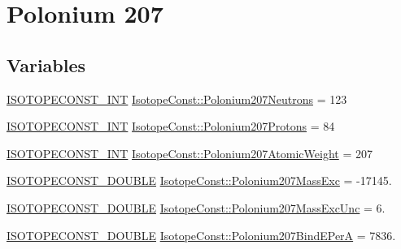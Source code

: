 \hypertarget{group___isotope_const-_polonium-_po207}{}\section{Polonium 207}
\label{group___isotope_const-_polonium-_po207}
\subsection*{Variables}
\begin{DoxyCompactItemize}
\item 
\mbox{\hyperlink{group___isotope_const-_macros_ga5f18360b3e99483a35c32d789e62621c}{I\+S\+O\+T\+O\+P\+E\+C\+O\+N\+S\+T\+\_\+\+I\+NT}} \mbox{\hyperlink{group___isotope_const-_polonium-_po207_ga2acaa5285ae419ba74379a15f175653b}{Isotope\+Const\+::\+Polonium207\+Neutrons}} = 123
\item 
\mbox{\hyperlink{group___isotope_const-_macros_ga5f18360b3e99483a35c32d789e62621c}{I\+S\+O\+T\+O\+P\+E\+C\+O\+N\+S\+T\+\_\+\+I\+NT}} \mbox{\hyperlink{group___isotope_const-_polonium-_po207_gadaff50db77aa5f2d809ebd6426570822}{Isotope\+Const\+::\+Polonium207\+Protons}} = 84
\item 
\mbox{\hyperlink{group___isotope_const-_macros_ga5f18360b3e99483a35c32d789e62621c}{I\+S\+O\+T\+O\+P\+E\+C\+O\+N\+S\+T\+\_\+\+I\+NT}} \mbox{\hyperlink{group___isotope_const-_polonium-_po207_gae773542bf06a99056120d7cf499d82ef}{Isotope\+Const\+::\+Polonium207\+Atomic\+Weight}} = 207
\item 
\mbox{\hyperlink{group___isotope_const-_macros_ga8f45a7272ce02c0b4c65c44636ed719a}{I\+S\+O\+T\+O\+P\+E\+C\+O\+N\+S\+T\+\_\+\+D\+O\+U\+B\+LE}} \mbox{\hyperlink{group___isotope_const-_polonium-_po207_ga9700001c68a8d4b0f597f633c959ab9c}{Isotope\+Const\+::\+Polonium207\+Mass\+Exc}} = -\/17145.
\item 
\mbox{\hyperlink{group___isotope_const-_macros_ga8f45a7272ce02c0b4c65c44636ed719a}{I\+S\+O\+T\+O\+P\+E\+C\+O\+N\+S\+T\+\_\+\+D\+O\+U\+B\+LE}} \mbox{\hyperlink{group___isotope_const-_polonium-_po207_gaa984110d2e50be5bb6bef09986b4e960}{Isotope\+Const\+::\+Polonium207\+Mass\+Exc\+Unc}} = 6.
\item 
\mbox{\hyperlink{group___isotope_const-_macros_ga8f45a7272ce02c0b4c65c44636ed719a}{I\+S\+O\+T\+O\+P\+E\+C\+O\+N\+S\+T\+\_\+\+D\+O\+U\+B\+LE}} \mbox{\hyperlink{group___isotope_const-_polonium-_po207_ga2cec4523b5c83f75d52ff0b54599b10b}{Isotope\+Const\+::\+Polonium207\+Bind\+E\+PerA}} = 7836.
\item 

\end{DoxyCompactItemize}

